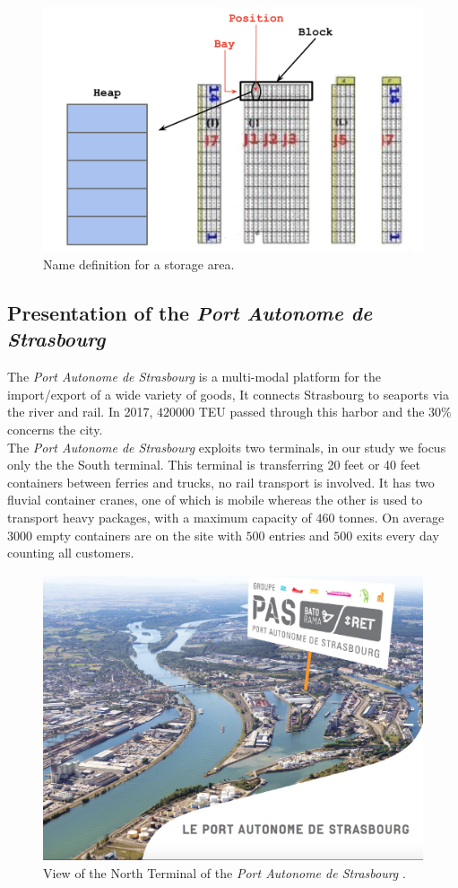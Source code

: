 \documentclass{article}
\newcommand{\PAS}{\emph{Port Autonome de Strasbourg }}
\begin{document}
\begin{figure}[h!]
	\centering
	\includegraphics[width=0.8\linewidth]{images/glossary.png}
	\caption{Name definition for a storage area.}
	\label{fig:name_definition}
\end{figure}


\subsection{Presentation of the \PAS}

The \PAS is a multi-modal platform for the import/export of a wide variety of goods, It connects Strasbourg to seaports via the river and rail.
In 2017, $ 420000 $ TEU passed through this harbor and the $ 30 \% $ concerns the city. \\
The \PAS exploits two terminals, in our study we focus only the the South terminal. 
This terminal is transferring 20 feet or 40 feet containers between ferries and trucks, no rail transport is involved. 
It has two fluvial container cranes, one of which is mobile whereas the other is used to transport heavy packages, with a maximum capacity of $ 460 $ tonnes.
On average $3000$ empty containers are on the site with $500$ entries and $500$ exits every day counting all customers.



\begin{figure}[!htb]
\centering
\includegraphics[width=0.7\linewidth]{images/PAS_satellite.png}
\caption{View of the North Terminal of the \PAS.}
\label{fig:pas_satellite}
\end{figure}
\end{document}

